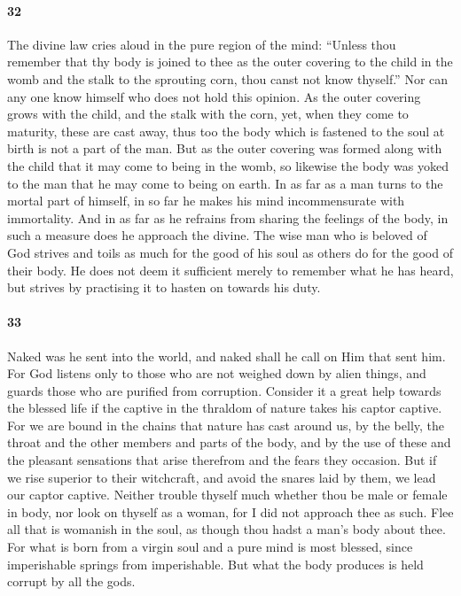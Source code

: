 \documentclass[12pt]{article}
\begin{document}
\paragraph{32} The divine law cries aloud in the pure region of the mind:
``Unless thou remember that thy body is joined to thee as the outer covering to
the child in the womb and the stalk to the sprouting corn, thou canst not know
thyself.'' Nor can any one know himself who does not hold this opinion. As the
outer covering grows with the child, and the stalk with the corn, yet, when
they come to maturity, these are cast away, thus too the body which is fastened
to the soul at birth is not a part of the man. But as the outer covering was
formed along with the child that it may come to being in the womb, so likewise
the body was yoked to the man that he may come to being on earth. In as far as
a man turns to the mortal part of himself, in so far he makes his mind
incommensurate with immortality. And in as far as he refrains from sharing the
feelings of the body, in such a measure does he approach the divine. The wise
man who is beloved of God strives and toils as much for the good of his soul as
others do for the good of their body. He does not deem it sufficient merely to
remember what he has heard, but strives by practising it to hasten on towards
his duty.

\paragraph{33} Naked was he sent into the world, and naked shall he call on Him
that sent him. For God listens only to those who are not weighed down by alien
things, and guards those who are purified from corruption. Consider it a great
help towards the blessed life if the captive in the thraldom of nature takes
his captor captive. For we are bound in the chains that nature has cast around
us, by the belly, the throat and the other members and parts of the body, and
by the use of these and the pleasant sensations that arise therefrom and the
fears they occasion. But if we rise superior to their witchcraft, and avoid the
snares laid by them, we lead our captor captive. Neither trouble thyself much
whether thou be male or female in body, nor look on thyself as a woman, for I
did not approach thee as such. Flee all that is womanish in the soul, as though
thou hadst a man's body about thee. For what is born from a virgin soul and a
pure mind is most blessed, since imperishable springs from imperishable. But
what the body produces is held corrupt by all the gods.
\end{document}
